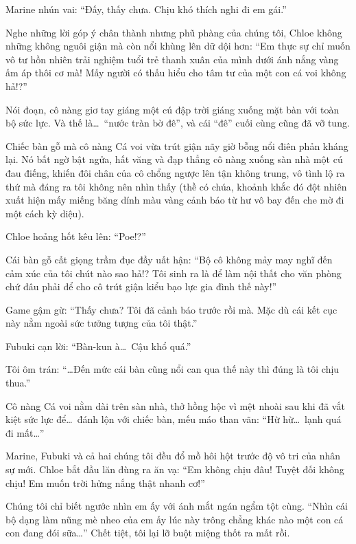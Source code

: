 \documentclass[../main.tex]{subfiles}
\begin{document}
Marine nhún vai: ``Đấy, thấy chưa. Chịu khó thích nghi đi em gái.''

Nghe những lời góp ý chân thành nhưng phũ phàng của chúng tôi, Chloe không những không nguôi giận mà còn nổi khùng lên dữ dội hơn: ``Em thực sự chỉ muốn vô tư hồn nhiên trải nghiệm tuổi trẻ thanh xuân của mình dưới ánh nắng vàng ấm áp thôi cơ mà! Mấy người có thấu hiểu cho tâm tư của một con cá voi không hả!?''

Nói đoạn, cô nàng giơ tay giáng một cú đập trời giáng xuống mặt bàn với toàn bộ sức lực. Và thế là\dots\ ``nước tràn bờ đê'', và cái ``đê'' cuối cùng cũng đã vỡ tung.

Chiếc bàn gỗ mà cô nàng Cá voi vừa trút giận nãy giờ bỗng nổi điên phản kháng lại. Nó bất ngờ bật ngửa, hất văng và đạp thẳng cô nàng xuống sàn nhà một cú đau điếng, khiến đôi chân của cô chổng ngược lên tận không trung, vô tình lộ ra thứ mà đáng ra tôi không nên nhìn thấy (thề có chúa, khoảnh khắc đó đột nhiên xuất hiện mấy miếng băng dính màu vàng cảnh báo từ hư vô bay đến che mờ đi một cách kỳ diệu).


Chloe hoảng hốt kêu lên: ``Poe!?''

Cái bàn gỗ cất giọng trầm đục đầy uất hận: ``Bộ cô không mảy may nghĩ đến cảm xúc của tôi chút nào sao hả!? Tôi sinh ra là để làm nội thất cho văn phòng chứ đâu phải để cho cô trút giận kiểu bạo lực gia đình thế này!''

Game gậm gừ: ``Thấy chưa? Tôi đã cảnh báo trước rồi mà. Mặc dù cái kết cục này nằm ngoài sức tưởng tượng của tôi thật.''

Fubuki cạn lời: ``Bàn-kun à\dots\ Cậu khổ quá.''

Tôi ôm trán: ``\dots Đến mức cái bàn cũng nổi can qua thế này thì đúng là tôi chịu thua.''

Cô nàng Cá voi nằm dài trên sàn nhà, thở hồng hộc vì mệt nhoài sau khi đã vắt kiệt sức lực để\dots\ đánh lộn với chiếc bàn, mếu máo than vãn: ``Hừ hừ\dots\ lạnh quá đi mất\dots''

Marine, Fubuki và cả hai chúng tôi đều đổ mồ hôi hột trước độ vô tri của nhân sự mới. Chloe bắt đầu lăn đùng ra ăn vạ: ``Em không chịu đâu! Tuyệt đối không chịu! Em muốn trời hửng nắng thật nhanh cơ!''

Chúng tôi chỉ biết ngước nhìn em ấy với ánh mắt ngán ngẩm tột cùng. ``Nhìn cái bộ dạng làm nũng mè nheo của em ấy lúc này trông chẳng khác nào một con cá con đang đói sữa\dots'' Chết tiệt, tôi lại lỡ buột miệng thốt ra mất rồi.
\end{document}
